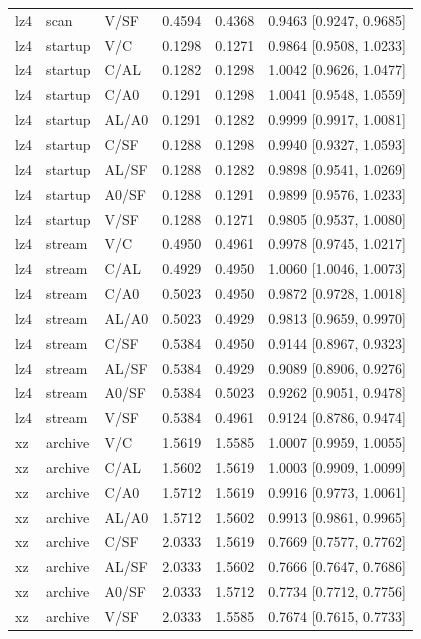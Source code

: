 \begin{longtable}{lllrrl}
lz4 & scan & V/SF & 0.4594 & 0.4368 & 0.9463 [0.9247, 0.9685] \\
lz4 & startup & V/C & 0.1298 & 0.1271 & 0.9864 [0.9508, 1.0233] \\
lz4 & startup & C/AL & 0.1282 & 0.1298 & 1.0042 [0.9626, 1.0477] \\
lz4 & startup & C/A0 & 0.1291 & 0.1298 & 1.0041 [0.9548, 1.0559] \\
lz4 & startup & AL/A0 & 0.1291 & 0.1282 & 0.9999 [0.9917, 1.0081] \\
lz4 & startup & C/SF & 0.1288 & 0.1298 & 0.9940 [0.9327, 1.0593] \\
lz4 & startup & AL/SF & 0.1288 & 0.1282 & 0.9898 [0.9541, 1.0269] \\
lz4 & startup & A0/SF & 0.1288 & 0.1291 & 0.9899 [0.9576, 1.0233] \\
lz4 & startup & V/SF & 0.1288 & 0.1271 & 0.9805 [0.9537, 1.0080] \\
lz4 & stream & V/C & 0.4950 & 0.4961 & 0.9978 [0.9745, 1.0217] \\
lz4 & stream & C/AL & 0.4929 & 0.4950 & 1.0060 [1.0046, 1.0073] \\
lz4 & stream & C/A0 & 0.5023 & 0.4950 & 0.9872 [0.9728, 1.0018] \\
lz4 & stream & AL/A0 & 0.5023 & 0.4929 & 0.9813 [0.9659, 0.9970] \\
lz4 & stream & C/SF & 0.5384 & 0.4950 & 0.9144 [0.8967, 0.9323] \\
lz4 & stream & AL/SF & 0.5384 & 0.4929 & 0.9089 [0.8906, 0.9276] \\
lz4 & stream & A0/SF & 0.5384 & 0.5023 & 0.9262 [0.9051, 0.9478] \\
lz4 & stream & V/SF & 0.5384 & 0.4961 & 0.9124 [0.8786, 0.9474] \\
xz & archive & V/C & 1.5619 & 1.5585 & 1.0007 [0.9959, 1.0055] \\
xz & archive & C/AL & 1.5602 & 1.5619 & 1.0003 [0.9909, 1.0099] \\
xz & archive & C/A0 & 1.5712 & 1.5619 & 0.9916 [0.9773, 1.0061] \\
xz & archive & AL/A0 & 1.5712 & 1.5602 & 0.9913 [0.9861, 0.9965] \\
xz & archive & C/SF & 2.0333 & 1.5619 & 0.7669 [0.7577, 0.7762] \\
xz & archive & AL/SF & 2.0333 & 1.5602 & 0.7666 [0.7647, 0.7686] \\
xz & archive & A0/SF & 2.0333 & 1.5712 & 0.7734 [0.7712, 0.7756] \\
xz & archive & V/SF & 2.0333 & 1.5585 & 0.7674 [0.7615, 0.7733] \\

\end{longtable}
